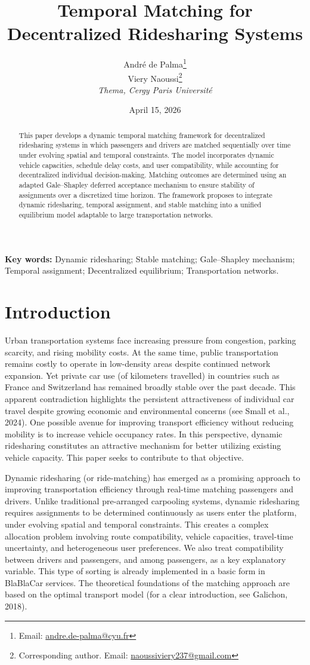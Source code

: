 \documentclass[11pt,a4paper]{article}
\title{Temporal Matching for Decentralized Ridesharing Systems}
\author{
  André de Palma\thanks{Email: \href{mailto:andre.de-palma@cyu.fr}{andre.de-palma@cyu.fr}} \\
  Viery Naoussi\thanks{Corresponding author. Email: \href{mailto:naoussiviery237@gmail.com}{naoussiviery237@gmail.com}} \\
  \textit{Thema, Cergy Paris Université}
}
\date{April 15, 2026}
\begin{document}
\baselineskip=16pt
\maketitle

\begin{abstract}
This paper develops a dynamic temporal matching framework for decentralized ridesharing systems in which passengers and drivers are matched sequentially over time under evolving spatial and temporal constraints. The model incorporates dynamic vehicle capacities, schedule delay costs, and user compatibility, while accounting for decentralized individual decision-making. Matching outcomes are determined using an adapted Gale–Shapley deferred acceptance mechanism to ensure stability of assignments over a discretized time horizon. The framework proposes to integrate dynamic ridesharing, temporal assignment, and stable matching into a unified equilibrium model adaptable to large transportation networks.
\end{abstract}

\textbf{Key words:} Dynamic ridesharing; Stable matching; Gale–Shapley mechanism; Temporal assignment; Decentralized equilibrium; Transportation networks.

\section{Introduction}
\indent Urban transportation systems face increasing pressure from congestion, parking scarcity, and rising mobility costs. At the same time, public transportation remains costly to operate in low-density areas despite continued network expansion. Yet private car use (of kilometers travelled) in countries such as France and Switzerland has remained broadly stable over the past decade. This apparent contradiction highlights the persistent attractiveness of individual car travel despite growing economic and environmental concerns (see Small et al., 2024). One possible avenue for improving transport efficiency without reducing mobility is to increase vehicle occupancy rates. In this perspective, dynamic ridesharing constitutes an attractive mechanism for better utilizing existing vehicle capacity. This paper seeks to contribute to that objective.

Dynamic ridesharing
 (or ride-matching) has emerged as a promising approach to improving transportation efficiency through real-time matching passengers and drivers. Unlike traditional pre-arranged carpooling systems, dynamic ridesharing requires assignments to be determined continuously as users enter the platform, under evolving spatial and temporal constraints. This creates a complex allocation problem involving route compatibility, vehicle capacities, travel-time uncertainty, and heterogeneous user preferences. We also treat compatibility between drivers and passengers, and among passengers, as a key explanatory variable. This type of sorting is already implemented in a basic form in BlaBlaCar services. The theoretical foundations of the matching approach are based on the optimal transport model (for a clear introduction, see Galichon, 2018).
\end{document}
